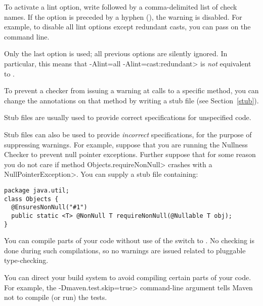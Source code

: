 
\noindent
To activate a lint option, write  followed by a
comma-delimited list of check names.  If the option is preceded by a
hyphen (\code{-}), the warning is disabled.  For example, to disable all
lint options except redundant casts, you can pass
 on the command line.

Only the last  option is used; all previous 
options are silently ignored.  In particular, this means that \<-Alint=all
-Alint=cast:redundant> is \emph{not} equivalent to
.



To prevent a checker from issuing a warning at calls to a specific method,
you can change the annotations on that method by writing a stub file (see
Section~\ref{stub}).

Stub files are usually used to provide correct specifications for
unspecified code.

Stub files can also be used to provide \emph{incorrect} specifications, for
the purpose of suppressing warnings.  For example, suppose that you are
running the Nullness Checker to prevent null pointer exceptions.  Further
suppose that for some reason you do not care if method
\<Objects.requireNonNull> crashes with a \<NullPointerException>.  You can
supply a stub file containing:

\begin{Verbatim}
package java.util;
class Objects {
  @EnsuresNonNull("#1")
  public static <T> @NonNull T requireNonNull(@Nullable T obj);
}
\end{Verbatim}



You can compile parts of your code without use of the
 switch to .  No checking is done during
such compilations, so no warnings are issued related to pluggable
type-checking.

You can direct your build system to avoid compiling certain parts of your
code.  For example, the \<-Dmaven.test.skip=true> command-line argument
tells Maven not to compile (or run) the tests.



